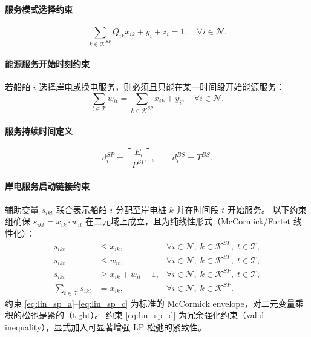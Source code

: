 \documentclass[UTF8, a4paper, 12pt]{ctexart}
\theoremstyle{plain}
\theoremstyle{definition}
\theoremstyle{remark}
\begin{document}
\paragraph{服务模式选择约束}
\begin{equation}
\sum_{k \in \mathcal{K}^{SP}} Q_{ik} x_{ik} + y_i + z_i = 1,
\quad \forall i \in \mathcal{N}.
\label{eq:mode_24_final}
\end{equation}

\paragraph{能源服务开始时刻约束}
若船舶 $i$ 选择岸电或换电服务，则必须且只能在某一时间段开始能源服务：
\begin{equation}
\sum_{t \in \mathcal{T}} w_{it}
=
\sum_{k \in \mathcal{K}^{SP}} x_{ik} + y_i,
\quad \forall i \in \mathcal{N}.
\label{eq:w_unique_24}
\end{equation}

\paragraph{服务持续时间定义}
\begin{equation}
d_i^{SP} = \left\lceil \frac{E_i}{P^{SP}} \right\rceil, 
\qquad
d_i^{BS} = T^{BS}.
\label{eq:duration_24}
\end{equation}

\paragraph{岸电服务启动链接约束}
辅助变量 $s_{ikt}$ 联合表示船舶 $i$ 分配至岸电桩 $k$ 并在时间段 $t$ 开始服务。
以下约束组确保 $s_{ikt} = x_{ik} \cdot w_{it}$ 在二元域上成立，且为纯线性形式（McCormick/Fortet 线性化）：
\begin{align}
s_{ikt} &\le x_{ik},
  & \forall i \in \mathcal{N},\; k \in \mathcal{K}^{SP},\; t \in \mathcal{T},
  \label{eq:lin_sp_a} \\
s_{ikt} &\le w_{it},
  & \forall i \in \mathcal{N},\; k \in \mathcal{K}^{SP},\; t \in \mathcal{T},
  \label{eq:lin_sp_b} \\
s_{ikt} &\ge x_{ik} + w_{it} - 1,
  & \forall i \in \mathcal{N},\; k \in \mathcal{K}^{SP},\; t \in \mathcal{T},
  \label{eq:lin_sp_c} \\
\sum_{t \in \mathcal{T}} s_{ikt} &= x_{ik},
  & \forall i \in \mathcal{N},\; k \in \mathcal{K}^{SP}.
  \label{eq:lin_sp_d}
\end{align}
约束 \eqref{eq:lin_sp_a}--\eqref{eq:lin_sp_c} 为标准的 McCormick envelope，对二元变量乘积的松弛是紧的（tight）。
约束 \eqref{eq:lin_sp_d} 为冗余强化约束（valid inequality），显式加入可显著增强 LP 松弛的紧致性。
\end{document}
